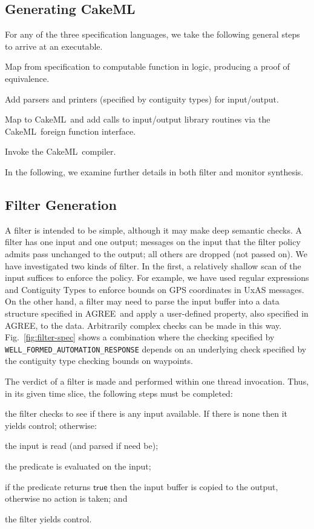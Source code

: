 \documentclass[global,twocolumn]{svjour}
\newcommand{\konst}[1]{\ensuremath{\mathsf{#1}}}
\newcommand{\figref}[1]{Fig.~\ref{#1}}
\newcommand{\agr}{AGREE}
\newcommand{\ckml}{CakeML}
\begin{document}
\subsection{Generating \ckml}
For any of the three specification languages, we take the following general steps to arrive at an executable.
%
\begin{compactenum}
\item Map from specification to computable function in logic, producing a proof of equivalence.
\item Add parsers and printers (specified by contiguity types) for input/output.
\item Map to \ckml\ and add calls to input/output library routines via the \ckml\ foreign function interface.
\item Invoke the \ckml\ compiler.
\end{compactenum}
%
In the following, we examine further details in both filter and monitor synthesis.


\subsection{Filter Generation}

A filter is intended to be simple, although it may make deep semantic checks.
%
A filter has one input and one output; messages on the input that the filter policy admits pass unchanged to the output;
%
all others are dropped (not passed on).
%
We have investigated two kinds of filter.
%
In the first, a relatively shallow scan of the input suffices to enforce the policy.
%
For example, we have used regular expressions and Contiguity Types to enforce bounds on GPS coordinates in UxAS messages.
%
On the other hand, a filter may need to parse the input buffer into a data structure specified in \agr\ and apply a user-defined property, also specified in \agr, to the data.
%
Arbitrarily complex checks can be made in this way.
%
\figref{fig:filter-spec} shows a combination where the checking specified by {\small\verb+WELL_FORMED_AUTOMATION_RESPONSE+} depends on an underlying check specified by the contiguity type checking bounds on waypoints.

The verdict of a filter is made and performed within one thread invocation.
%
Thus, in its given time slice, the following steps must be completed:
\begin{compactenum}
\item
the filter checks to see if there is any input available.
%
If there is none then it yields control; otherwise:

\item the input is read (and parsed if need be);

\item the predicate is evaluated on the input;

\item if the predicate returns \konst{true} then the input buffer
 is copied to the output, otherwise no action is taken; and

\item the filter yields control.
\end{compactenum}
\end{document}
